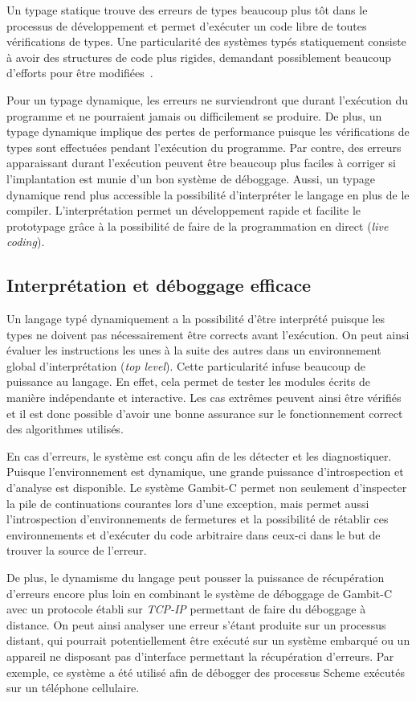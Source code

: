 \documentclass[12pt,twoside,letterpaper,francais]{book}
\begin{document}
Un typage statique trouve des erreurs de types beaucoup plus tôt dans
le processus de dévelop\-pement et permet d'exécuter un code libre de
toutes vérifications de types. Une particularité des systèmes typés
statiquement consiste à avoir des structures de code plus rigides,
demandant possiblement beaucoup d'efforts pour être
modifiées~\cite{StaticVSDynamic}.

Pour un typage dynamique, les erreurs ne surviendront que durant
l'exécution du programme et ne pourraient jamais ou difficilement se
produire. De plus, un typage dynamique implique des pertes de
performance puisque les vérifications de types sont effectuées pendant
l'exécution du programme. Par contre, des erreurs apparaissant durant
l'exécution peuvent être beaucoup plus faciles à corriger si
l'implantation est munie d'un bon système de déboggage. Aussi, un
typage dynamique rend plus accessible la possibilité d'interpréter le
langage en plus de le compiler. L'interprétation permet un
dévelop\-pement rapide et facilite le prototypage grâce à la possibilité
de faire de la programmation en direct (\textit{live coding}).


\FloatBarrier
\subsection{Interprétation et déboggage efficace}
Un langage typé dynamiquement a la possibilité d'être interprété
puisque les types ne doivent pas nécessairement être corrects avant
l'exécution. On peut ainsi évaluer les instructions les unes à la
suite des autres dans un environnement global d'interprétation
(\textit{top level}). Cette particularité infuse beaucoup de puissance
au langage. En effet, cela permet de tester les modules écrits de
manière indépendante et interactive. Les cas extrêmes peuvent ainsi
être vérifiés et il est donc possible d'avoir une bonne assurance sur
le fonctionnement correct des algorithmes utilisés.

En cas d'erreurs, le système est conçu afin de les détecter et les
diagnostiquer. Puisque l'environnement est dynamique, une grande
puissance d'introspection et d'analyse est disponible. Le système
Gambit-C permet non seulement d'inspecter la pile de continuations
courantes lors d'une exception, mais permet aussi l'introspection
d'environnements de fermetures et la possibilité de rétablir ces
environnements et d'exécuter du code arbitraire dans ceux-ci dans le
but de trouver la source de l'erreur.

De plus, le dynamisme du langage peut pousser la puissance de
récupération d'erreurs encore plus loin en combinant le système de
déboggage de Gambit-C avec un protocole établi sur \textit{TCP-IP}
permettant de faire du déboggage à distance. On peut ainsi analyser
une erreur s'étant produite sur un processus distant, qui pourrait
potentiellement être exécuté sur un système embarqué ou un appareil ne
disposant pas d'interface permettant la récupération d'erreurs. Par
exemple, ce système a été utilisé afin de débogger des processus
Scheme exécutés sur un téléphone cellulaire.
\end{document}
